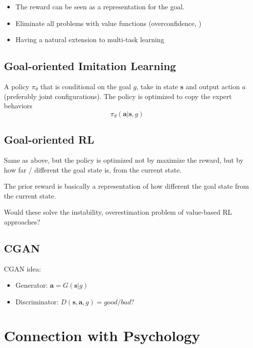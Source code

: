 \note
\begin{itemize}
	\item The reward can be seen as a representation for the goal.
	\item Eliminate all problems with value functions (overconfidence, \etc)
	\item Having a natural extension to multi-task learning
\end{itemize}

\subsection{Goal-oriented Imitation Learning}
A policy $\pi_\theta$ that is conditional on the goal $g$, take in state $\textbf{s}$ and output action $a$ (preferably joint configurations). The policy is optimized to copy the expert behaviors
\begin{equation}
	\pi_\theta(\textbf{a} | \textbf{s}, g)
\end{equation}

\subsection{Goal-oriented RL}
Same as above, but the policy is optimized not by maximize the reward, but by how far / different the goal state is, from the current state.

The prior reward is basically a representation of how different the goal state from the current state.

Would these solve the instability, overestimation problem of value-based \ac{RL} approaches?

\subsection{CGAN}
\ac{CGAN} idea:
\begin{itemize}
	\item Generator: $\textbf{a} = G(\textbf{s} | g)$
	\item Discriminator: $D(\textbf{s}, \textbf{a}, g) = good/bad?$
\end{itemize}


\section{Connection with Psychology}

